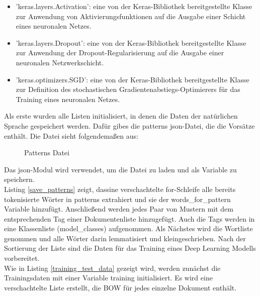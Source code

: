 \begin{itemize}
    \item 'keras.layers.Activation': eine von der Keras-Bibliothek bereitgestellte Klasse zur Anwendung von Aktivierungsfunktionen auf die Ausgabe einer Schicht eines neuronalen Netzes.
    \item 'keras.layers.Dropout': eine von der Keras-Bibliothek bereitgestellte Klasse zur Anwendung der Dropout-Regularisierung auf die Ausgabe einer neuronalen Netzwerkschicht.
    \item 'keras.optimizers.SGD': eine von der Keras-Bibliothek bereitgestellte Klasse zur Definition des stochastischen Gradientenabstiegs-Optimierers für das Training eines neuronalen Netzes.
\end{itemize}
Als erste wurden alle Listen initialisiert, in denen die Daten der natürlichen Sprache gespeichert werden. 
Dafür gibes die \glqq{}patterns\grqq{} json-Datei, die die \glqq{}Vorsätze\grqq{} enthält. Die Datei sieht folgendemaßen aus:
\begin{figure}[H]
    \centering
    \caption{\label{figure:Json_Patterns}Patterns Datei}
\end{figure}
\noindent
Das json-Modul wird verwendet, um die Datei zu laden und als Variable zu speichern.\\

Listing \ref{save_patterns} zeigt, dassine verschachtelte for-Schleife alle bereits tokenisierte Wörter in \glqq{}patterns\grqq{} extrahiert und sie der \glqq{}words\_for\_pattern\grqq{} Variable hinzufügt.
Anschließend werden jedes Paar von Mustern mit dem entsprechenden Tag einer Dokumentenliste hinzugefügt. 
Auch die Tags werden in eine Klassenliste (\glqq{}model\_classes\grqq{}) aufgenommen.
Als Nächstes wird die Wortliste genommen und alle Wörter darin lemmatisiert und kleingeschrieben. 
Nach der Sortierung der Liste sind die Daten für das Training eines Deep Learning Modells vorbereitet.\\

Wie in Listing \ref{training_test_data} gezeigt wird, werden zunächst die Trainingsdaten mit einer Variable \glqq{}training\grqq{} initialisiert. 
Es wird eine verschachtelte Liste erstellt, die \ac{BOW} für jedes einzelne Dokument enthält. 
